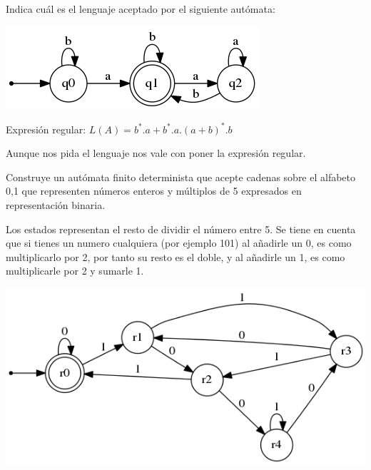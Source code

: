 \begin{problem}[3]
Indica cuál es el lenguaje aceptado por el siguiente autómata:\\
\begin{center}
\includegraphics[scale=0.75]{tex/ejerciciosHoja1/automata_3.png}
\end{center}


\solution
Expresión regular: $L(A)=b^*.a+b^*.a.(a+b)^*.b$

Aunque nos pida el lenguaje nos vale con poner la expresión regular.


\end{problem}


\begin{problem}[4]
Construye un autómata finito determinista que acepte cadenas sobre el alfabeto {0,1} que representen números enteros y múltiplos de 5 expresados en representación binaria.

\solution
\begin{expla}
Los estados representan el resto de dividir el número entre 5. Se tiene en cuenta que si tienes un numero cualquiera (por ejemplo 101) al añadirle un 0, es como multiplicarlo por 2, por tanto su resto es el doble, y al añadirle un 1, es como multiplicarle por 2 y sumarle 1.
\end{expla}
\begin{center}
\includegraphics[scale=0.75]{tex/ejerciciosHoja1/automata_4.png}
\end{center}

\end{problem}

